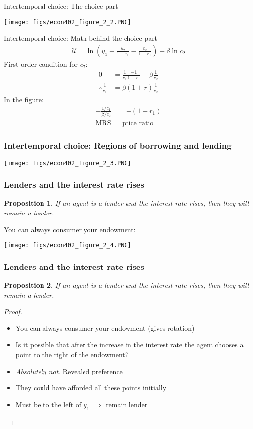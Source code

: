 \documentclass[presentation,dvipsnames]{beamer}
\newtheorem{prop}{Proposition}
\begin{document}
\begin{frame}[label=sec-2-1]{Intertemporal choice: The choice part}
\centerline{\texttt{[image: figs/econ402\_figure\_2\_2.PNG]}}
\end{frame}

\begin{frame}[label=sec-2-1]{Intertemporal choice: Math behind the choice part}
\begin{align*}
\mathcal{U} = \ln \left( y_{1} + \frac{y_{2}}{1+r_{1}} - \frac{c_{2}}{1+r_{1}} \right) +
\beta \ln c_{2}
\end{align*}
First-order condition for $c_{2}$:
\begin{align*}
0 &= \frac{1}{c_{1}} \frac{-1}{1+r_{1}} + \beta \frac{1}{c_{2}} \\
\therefore \frac{1}{c_{1}} &= \beta (1+r) \frac{1}{c_{2}}
\end{align*}
In the figure:
\begin{align*}
- \frac{1 / c_{1}}{\beta / c_{2}} &= - (1+r_{1}) \\
\text{MRS} &= \text{price ratio}
\end{align*}
\end{frame}

\begin{frame}
\frametitle{Intertemporal choice: Regions of borrowing and lending}
\centerline{\texttt{[image: figs/econ402\_figure\_2\_3.PNG]}}
\end{frame}

\begin{frame}
\frametitle{Lenders and the interest rate rises}
\begin{prop}
\label{prop:1}
If an agent is a lender and the interest rate rises,
then they will remain a lender.
\end{prop}
You can always consumer your endowment:
\centerline{\texttt{[image: figs/econ402\_figure\_2\_4.PNG]}}
\end{frame}

\begin{frame}
\frametitle{Lenders and the interest rate rises}
\begin{prop}
\label{prop:1}
If an agent is a lender and the interest rate rises,
then they will remain a lender.
\end{prop}

\begin{proof}
\begin{itemize}[label={--}]
\item You can always consumer your endowment (gives rotation)
\item Is it possible that after the increase in the interest rate the agent chooses a point to the right of the endowment?
\item \emph{Absolutely not}. Revealed preference
\item They could have afforded all these points initially
\item Must be to the left of $y_{1} \implies$ remain lender
\end{itemize}
\end{proof}
\end{frame}
\end{document}
